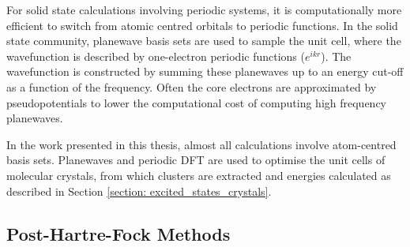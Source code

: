 For solid state calculations involving periodic systems, it is computationally more efficient to switch from atomic centred orbitals to periodic functions. In the solid state community, planewave basis sets are used to sample the unit cell, where the wavefunction is described by one-electron periodic functions ($e^{ikr}$). The wavefunction is constructed by summing these planewaves up to an energy cut-off as a function of the frequency. Often the core electrons are approximated by pseudopotentials to lower the computational cost of computing high frequency planewaves. 

In the work presented in this thesis, almost all calculations involve atom-centred basis sets. Planewaves and periodic DFT are used to optimise the unit cells of molecular crystals, from which clusters are extracted and energies calculated as described in Section \ref{section: excited_states_crystals}. 


\subsection{Post-Hartre-Fock Methods}\label{section: methods_postHF}
